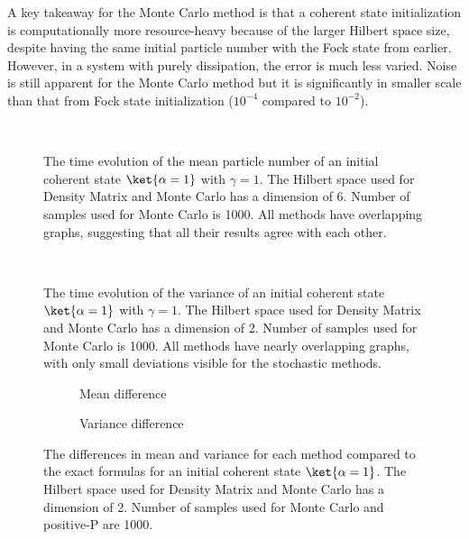 \hspace{\parindent}A key takeaway for the Monte Carlo method is that a coherent state initialization is computationally more resource-heavy because of the larger Hilbert space size, despite having the same initial particle number with the Fock state from earlier. However, in a system with purely dissipation, the error is much less varied. Noise is still apparent for the Monte Carlo method but it is significantly in smaller scale than that from Fock state initialization ($10^{-4}$ compared to $10^{-2}$).


\begin{figure}[h]
  \centering
  \\
  \caption{
  The time evolution of the mean particle number of an initial coherent state $\ket{\alpha=1}$ with $\gamma=1$. The Hilbert space used for Density Matrix and Monte Carlo has a dimension of 6. Number of samples used for Monte Carlo is 1000. All methods have overlapping graphs, suggesting that all their results agree with each other.
  }\label{fig:coherentMean}
\end{figure}
\begin{figure}[h]
  \centering
  \\
  \caption{
  The time evolution of the variance of an initial coherent state $\ket{\alpha=1}$ with $\gamma=1$. The Hilbert space used for Density Matrix and Monte Carlo has a dimension of 2. Number of samples used for Monte Carlo is 1000. All methods have nearly overlapping graphs, with only small deviations visible for the stochastic methods.
  }\label{fig:coherentVariance}
\end{figure}
\begin{figure}[h]
  \centering
  \begin{subfigure}{0.48\columnwidth}
    \centering
    
    \caption{Mean difference}
    \label{fig:coherentMeanDifference}
  \end{subfigure}
  \hfill
  \begin{subfigure}{0.48\columnwidth}
    \centering
    
    \caption{Variance difference}
    \label{fig:coherentVarDifference}
  \end{subfigure}
  \caption{
  The differences in mean and variance for each method compared to the exact formulas for an initial coherent state $\ket{\alpha=1}$. The Hilbert space used for Density Matrix and Monte Carlo has a dimension of 2. Number of samples used for Monte Carlo and positive-P are 1000.
  }
  \label{fig:coherentDifference}
\end{figure}